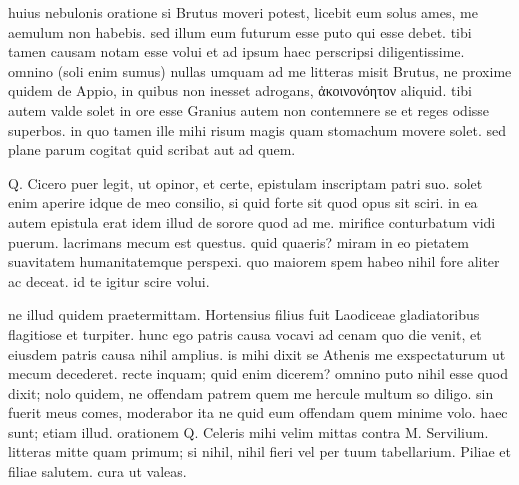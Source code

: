  huius nebulonis oratione si Brutus moveri potest, licebit eum solus ames, me aemulum non habebis. sed illum eum futurum esse puto qui esse debet. tibi tamen causam notam esse volui et ad ipsum haec perscripsi diligentissime. omnino (soli enim sumus) nullas umquam ad me litteras misit Brutus, ne proxime quidem de Appio, in quibus non inesset adrogans, ἀκοινονόητον aliquid. tibi autem valde solet in ore esse Granius autem non contemnere se et reges odisse superbos. in quo tamen ille mihi risum magis quam stomachum movere solet. sed plane parum cogitat quid scribat aut ad quem.

 Q. Cicero puer legit, ut opinor, et certe, epistulam inscriptam patri suo. solet enim aperire idque de meo consilio, si quid forte sit quod opus sit sciri. in ea autem epistula erat idem illud de sorore quod ad me. mirifice conturbatum vidi puerum. lacrimans mecum est questus. quid quaeris? miram in eo pietatem suavitatem humanitatemque perspexi. quo maiorem spem habeo nihil fore aliter ac deceat. id te igitur scire volui.

 ne illud quidem praetermittam. Hortensius filius fuit Laodiceae gladiatoribus flagitiose et turpiter. hunc ego patris causa vocavi ad cenam quo die venit, et eiusdem patris causa nihil amplius. is mihi dixit se Athenis me exspectaturum ut mecum decederet. recte inquam; quid enim dicerem? omnino puto nihil esse quod dixit; nolo quidem, ne offendam patrem quem me hercule multum so diligo. sin fuerit meus comes, moderabor ita ne quid eum offendam quem minime volo. haec sunt; etiam illud. orationem Q. Celeris mihi velim mittas contra M. Servilium. litteras mitte quam primum; si nihil, nihil fieri vel per tuum tabellarium. Piliae et filiae salutem. cura ut valeas.
